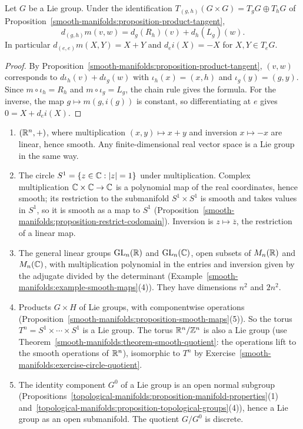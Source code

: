 \begin{lemma}\label{lie-groups:lemma-differential-multiplication}
Let $G$ be a Lie group. Under the identification $T_{(g,h)}(G \times G) = T_gG \oplus T_hG$ of
Proposition~\ref{smooth-manifolds:proposition-product-tangent},
\[
d_{(g,h)}m(v, w) = d_g(R_h)(v) + d_h(L_g)(w).
\]
In particular $d_{(e,e)}m(X, Y) = X + Y$ and $d_ei(X) = -X$ for $X, Y \in T_eG$.
\end{lemma}

\begin{proof}
By Proposition~\ref{smooth-manifolds:proposition-product-tangent}, $(v, w)$ corresponds to $d\iota_h(v) + d\iota_g(w)$ with $\iota_h(x) = (x, h)$ and
$\iota_g(y) = (g, y)$. Since $m \circ \iota_h = R_h$ and $m \circ \iota_g = L_g$, the chain rule gives the formula. For the inverse, the map
$g \mapsto m(g, i(g))$ is constant, so differentiating at $e$ gives $0 = X + d_ei(X)$.
\end{proof}

\begin{example}\label{lie-groups:example-lie-groups}
\begin{enumerate}
\item $(\mathbb{R}^n, +)$, where multiplication $(x, y) \mapsto x + y$ and inversion $x \mapsto -x$ are linear, hence smooth. Any finite-dimensional real vector space
is a Lie group in the same way.
\item The circle $S^1 = \{z \in \mathbb{C} : |z| = 1\}$ under multiplication. Complex multiplication $\mathbb{C} \times \mathbb{C} \to \mathbb{C}$ is a polynomial map of the real
coordinates, hence smooth; its restriction to the submanifold $S^1 \times S^1$ is smooth and takes values in $S^1$, so it is smooth as a map to $S^1$
(Proposition~\ref{smooth-manifolds:proposition-restrict-codomain}). Inversion is $z \mapsto \overline{z}$, the restriction of a linear map.
\item The general linear groups $\mathrm{GL}_n(\mathbb{R})$ and $\mathrm{GL}_n(\mathbb{C})$, open subsets of $M_n(\mathbb{R})$ and $M_n(\mathbb{C})$, with multiplication polynomial in the entries and
inversion given by the adjugate divided by the determinant (Example~\ref{smooth-manifolds:example-smooth-maps}(4)). They have dimensions $n^2$ and $2n^2$.
\item Products $G \times H$ of Lie groups, with componentwise operations (Proposition~\ref{smooth-manifolds:proposition-smooth-maps}(5)). So the torus
$T^n = S^1 \times \cdots \times S^1$ is a Lie group. The torus $\mathbb{R}^n/\mathbb{Z}^n$ is also a Lie group (use Theorem~\ref{smooth-manifolds:theorem-smooth-quotient}:
the operations lift to the smooth operations of $\mathbb{R}^n$), isomorphic to $T^n$ by Exercise~\ref{smooth-manifolds:exercise-circle-quotient}.
\item The identity component $G^0$ of a Lie group is an open normal subgroup
(Propositions~\ref{topological-manifolds:proposition-manifold-properties}(1) and~\ref{topological-manifolds:proposition-topological-groups}(4)), hence a Lie
group as an open submanifold. The quotient $G/G^0$ is discrete.
\end{enumerate}
\end{example}

